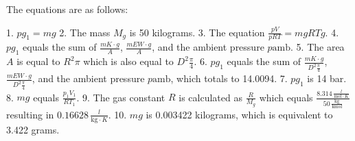 The equations are as follows:

1. \( p g_1 = m g \)
2. The mass \( M_g \) is 50 kilograms.
3. The equation \( \frac{p V}{p R T} = m g R T g \).
4. \( p g_1 \) equals the sum of \( \frac{m K \cdot g}{A} \), \( \frac{m E W \cdot g}{A} \), and the ambient pressure \( p \text{amb} \).
5. The area \( A \) is equal to \( R^2 \pi \) which is also equal to \( D^2 \frac{\pi}{4} \).
6. \( p g_1 \) equals the sum of \( \frac{m K \cdot g}{D^2 \frac{\pi}{4}} \), \( \frac{m E W \cdot g}{D^2 \frac{\pi}{4}} \), and the ambient pressure \( p \text{amb} \), which totals to 14.0094.
7. \( p g_1 \) is 14 bar.
8. \( m g \) equals \( \frac{p_1 V_1}{R T_1} \).
9. The gas constant \( R \) is calculated as \( \frac{R}{M_g} \) which equals \( \frac{8.314 \, \frac{l}{\text{mol} \cdot K}}{50 \, \frac{\text{kg}}{\text{kmol}}} \) resulting in \( 0.16628 \, \frac{l}{\text{kg} \cdot K} \).
10. \( m g \) is 0.003422 kilograms, which is equivalent to 3.422 grams.